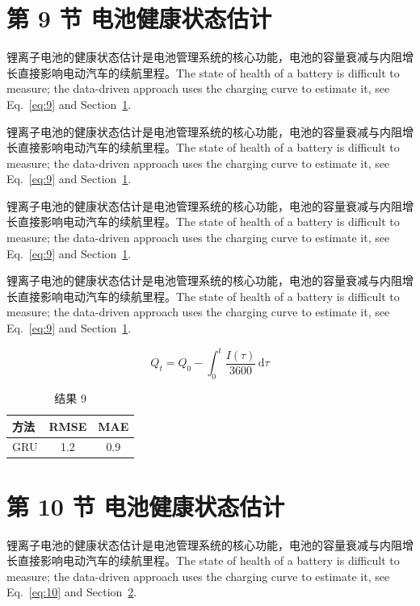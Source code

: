 \documentclass[UTF8,fontset=mac]{ctexart}
\begin{document}
\section{第 9 节 电池健康状态估计}\label{sec:9}
锂离子电池的健康状态估计是电池管理系统的核心功能，电池的容量衰减与内阻增长直接影响电动汽车的续航里程\cite{a2020}。The state of health of a battery is difficult to measure; the data-driven approach uses the charging curve to estimate it, see Eq.~\eqref{eq:9} and Section~\ref{sec:9}.

锂离子电池的健康状态估计是电池管理系统的核心功能，电池的容量衰减与内阻增长直接影响电动汽车的续航里程\cite{a2020}。The state of health of a battery is difficult to measure; the data-driven approach uses the charging curve to estimate it, see Eq.~\eqref{eq:9} and Section~\ref{sec:9}.

锂离子电池的健康状态估计是电池管理系统的核心功能，电池的容量衰减与内阻增长直接影响电动汽车的续航里程\cite{a2020}。The state of health of a battery is difficult to measure; the data-driven approach uses the charging curve to estimate it, see Eq.~\eqref{eq:9} and Section~\ref{sec:9}.

锂离子电池的健康状态估计是电池管理系统的核心功能，电池的容量衰减与内阻增长直接影响电动汽车的续航里程\cite{a2020}。The state of health of a battery is difficult to measure; the data-driven approach uses the charging curve to estimate it, see Eq.~\eqref{eq:9} and Section~\ref{sec:9}.

\begin{equation}\label{eq:9}
  Q_t = Q_0 - \int_0^t \frac{I(\tau)}{3600}\,\mathrm{d}\tau
\end{equation}
\begin{table}[h]\centering\begin{tabular}{lcc}\toprule 方法 & RMSE & MAE\\\midrule GRU & 1.2 & 0.9\\\bottomrule\end{tabular}\caption{结果 9}\end{table}

\section{第 10 节 电池健康状态估计}\label{sec:10}
锂离子电池的健康状态估计是电池管理系统的核心功能，电池的容量衰减与内阻增长直接影响电动汽车的续航里程\cite{a2020}。The state of health of a battery is difficult to measure; the data-driven approach uses the charging curve to estimate it, see Eq.~\eqref{eq:10} and Section~\ref{sec:10}.
\end{document}
